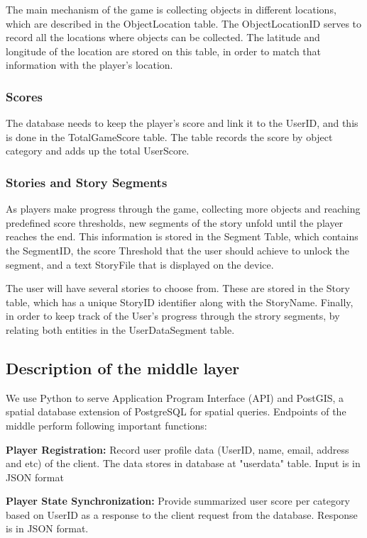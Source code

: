 \documentclass[conference]{IEEEtran}
\begin{document}
The main mechanism of the game is collecting objects in different locations, which are described in the ObjectLocation table. The ObjectLocationID serves to record all the locations where objects can be collected. The latitude and longitude of the location are stored on this table, in order to match that information with the player’s location.

\subsubsection*{Scores} 
The database needs to keep the player’s score and link it to the UserID, and this is done in the TotalGameScore table. The table records the score by object category and adds up the total UserScore. 

\subsubsection*{Stories and Story Segments}
As players make progress through the game, collecting more objects and reaching predefined score thresholds, new segments of the story unfold until the player reaches the end. This information is stored in the Segment Table, which contains the SegmentID, the score Threshold that the user should achieve to unlock the segment, and a text StoryFile that is displayed on the device. 

The user will have several stories to choose from. These are stored in the Story table, which has a unique StoryID identifier along with the StoryName. 
Finally, in order to keep track of the User’s progress through the strory segments, by relating both entities in the UserDataSegment table. 

\subsection{Description of the middle layer}

We use Python to serve Application Program Interface (API) and PostGIS, a spatial database extension of PostgreSQL for spatial queries. Endpoints of the middle perform following important functions:

\textbf{Player Registration:} Record user profile data (UserID, name, email, address and etc) of the client. The data stores in database at "userdata" table.  Input is in JSON format 

\textbf{Player State Synchronization:} Provide summarized user score per category based on UserID as a response to the client request from the database. Response is in JSON format.
\end{document}
